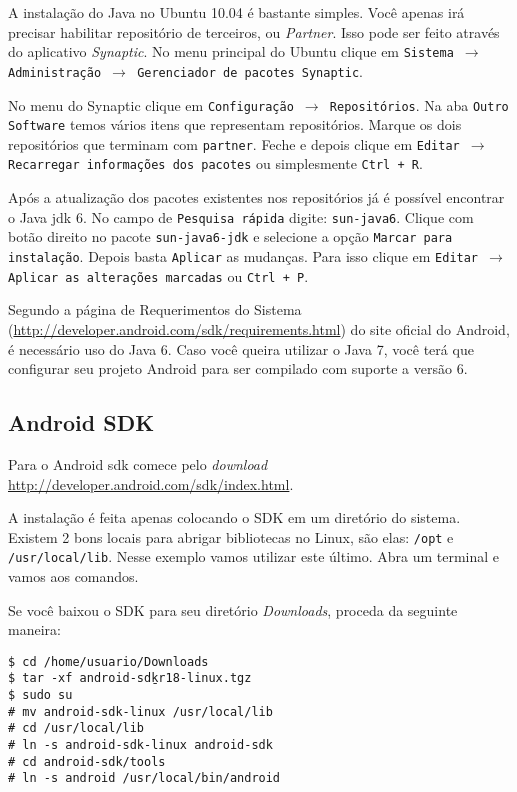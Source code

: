A instalação do Java no Ubuntu 10.04 é bastante simples. Você apenas irá precisar habilitar repositório
de terceiros, ou \textit{Partner}. Isso pode ser feito através do aplicativo \textit{Synaptic}. No menu
principal do Ubuntu clique em \texttt{Sistema $\rightarrow$ Administração $\rightarrow$ Gerenciador de pacotes
Synaptic}.

No menu do Synaptic clique em \texttt{Configuração $\rightarrow$ Repositórios}. Na aba \texttt{Outro Software}
temos vários itens que representam repositórios. Marque os dois repositórios que terminam com \texttt{partner}.
Feche e depois clique em \texttt{Editar $\rightarrow$ Recarregar informações dos pacotes} ou simplesmente
\texttt{Ctrl + R}.

Após a atualização dos pacotes existentes nos repositórios já é possível encontrar o Java \gls{jdk} 6.
No campo de \texttt{Pesquisa rápida} digite: \texttt{sun-java6}. Clique com botão direito no pacote
\texttt{sun-java6-jdk} e selecione a opção \texttt{Marcar para instalação}. Depois basta \texttt{Aplicar}
as mudanças. Para isso clique em \texttt{Editar $\rightarrow$ Aplicar as alterações marcadas} ou \texttt{Ctrl + P}.

Segundo a página de Requerimentos do Sistema (\url{http://developer.android.com/sdk/requirements.html})
do site oficial do Android, é necessário uso do Java 6. Caso você queira utilizar o Java 7, você
terá que configurar seu projeto Android para ser compilado com suporte a versão 6.

\subsection{Android SDK \label{ssec:sdk}}

Para o Android \gls{sdk} comece pelo \textit{download} \url{http://developer.android.com/sdk/index.html}.

A instalação é feita apenas colocando o SDK em um diretório do sistema. Existem 2 bons locais para
abrigar bibliotecas no Linux, são elas: \texttt{/opt} e \texttt{/usr/local/lib}. Nesse exemplo vamos
utilizar este último. Abra um terminal e vamos aos comandos.

Se você baixou o SDK para seu diretório \textit{Downloads}, proceda da seguinte maneira:

\medskip

\begin{flushleft}
\texttt{\$ cd /home/usuario/Downloads \\
\$ tar -xf android-sdk\b{ }r18-linux.tgz \\
\$ sudo su \\
\# mv android-sdk-linux /usr/local/lib \\
\# cd /usr/local/lib \\
\# ln -s android-sdk-linux android-sdk \\
\# cd android-sdk/tools \\
\# ln -s android /usr/local/bin/android \\
}
\end{flushleft}

